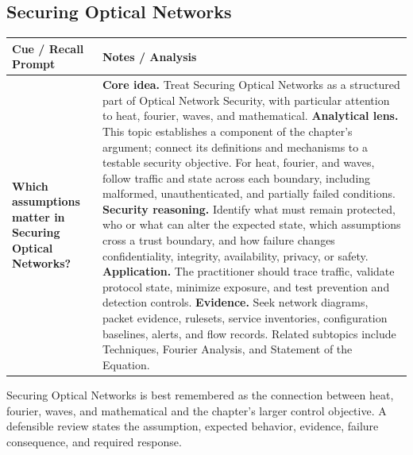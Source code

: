 \documentclass[11pt]{article}
\newcommand{\CornellHeader}{%
\rowcolor{Navy}\color{white}\bfseries Cue / Recall Prompt & \color{white}\bfseries Notes / Analysis\\\hline}
\newcommand{\CornellRow}[2]{%
\cellcolor{CueGray}\RaggedRight\textbf{#1} & \RaggedRight #2\\\hline}
\begin{document}
\subsection*{Securing Optical Networks}
\begin{longtable}{>{\RaggedRight\arraybackslash}p{}|>{\RaggedRight\arraybackslash}p{}}
\CornellHeader
\CornellRow{Which assumptions matter in Securing Optical Networks?}{\textbf{Core idea.} Treat Securing Optical Networks as a structured part of Optical Network Security, with particular attention to heat, fourier, waves, and mathematical. \textbf{Analytical lens.} This topic establishes a component of the chapter's argument; connect its definitions and mechanisms to a testable security objective. For heat, fourier, and waves, follow traffic and state across each boundary, including malformed, unauthenticated, and partially failed conditions. \textbf{Security reasoning.} Identify what must remain protected, who or what can alter the expected state, which assumptions cross a trust boundary, and how failure changes confidentiality, integrity, availability, privacy, or safety. \textbf{Application.} The practitioner should trace traffic, validate protocol state, minimize exposure, and test prevention and detection controls. \textbf{Evidence.} Seek network diagrams, packet evidence, rulesets, service inventories, configuration baselines, alerts, and flow records. Related subtopics include Techniques, Fourier Analysis, and Statement of the Equation.}
\end{longtable}
\begin{topicsummary}
Securing Optical Networks is best remembered as the connection between heat, fourier, waves, and mathematical and the chapter's larger control objective. A defensible review states the assumption, expected behavior, evidence, failure consequence, and required response.
\end{topicsummary}
\end{document}
